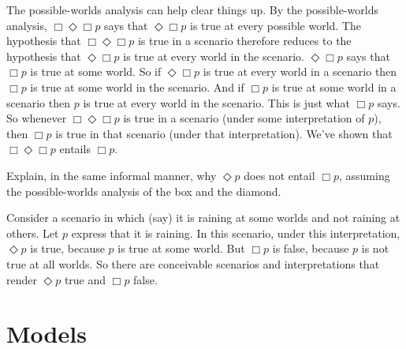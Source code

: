 The possible-worlds analysis can help clear things up. By the possible-worlds
analysis, $\Box \Diamond \Box p$ says that $\Diamond \Box p$ is true at every
possible world. The hypothesis that $\Box \Diamond \Box p$ is true in a scenario
therefore reduces to the hypothesis that $\Diamond \Box p$ is true at every
world in the scenario. $\Diamond\Box p$ says that $\Box p$ is true at some
world. So if $\Diamond\Box p$ is true at every world in a scenario then $\Box p$
is true at some world in the scenario. And if $\Box p$ is true at some world in
a scenario then $p$ is true at every world in the scenario. This is just what
$\Box p$ says. So whenever $\Box \Diamond\Box p$ is true in a scenario (under
some interpretation of $p$), then $\Box p$ is true in that scenario (under that
interpretation). We've shown that $\Box\Diamond\Box p$ entails $\Box p$.

\begin{exercise}
  Explain, in the same informal manner, why $\Diamond p$ does not entail
  $\Box p$, assuming the possible-worlds analysis of the box and the diamond.
\end{exercise}
\begin{solution}
  Consider a scenario in which (say) it is raining at some worlds and not
  raining at others. Let $p$ express that it is raining. In this scenario, under
  this interpretation, $\Diamond p$ is true, because $p$ is true at some world.
  But $\Box p$ is false, because $p$ is not true at all worlds. So there are conceivable scenarios and interpretations that render $\Diamond p$ true and $\Box p$ false.
\end{solution}


\section{Models}
\label{sec:basicmodels}

